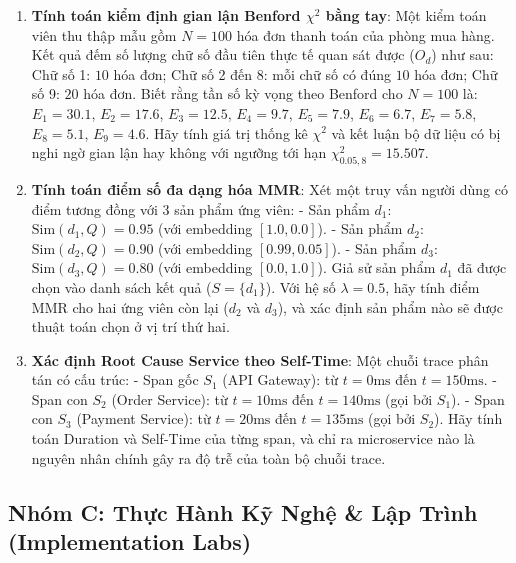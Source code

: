 \begin{enumerate}[label=\textbf{B\arabic*.}]
  \item \textbf{Tính toán kiểm định gian lận Benford $\chi^2$ bằng tay}:
  Một kiểm toán viên thu thập mẫu gồm $N = 100$ hóa đơn thanh toán của phòng mua hàng. Kết quả đếm số lượng chữ số đầu tiên thực tế quan sát được ($O_d$) như sau:
  Chữ số 1: $10$ hóa đơn; Chữ số 2 đến 8: mỗi chữ số có đúng $10$ hóa đơn; Chữ số 9: $20$ hóa đơn.
  Biết rằng tần số kỳ vọng theo Benford cho $N=100$ là: $E_1 = 30.1$, $E_2 = 17.6$, $E_3 = 12.5$, $E_4 = 9.7$, $E_5 = 7.9$, $E_6 = 6.7$, $E_7 = 5.8$, $E_8 = 5.1$, $E_9 = 4.6$.
  Hãy tính giá trị thống kê $\chi^2$ và kết luận bộ dữ liệu có bị nghi ngờ gian lận hay không với ngưỡng tới hạn $\chi^2_{0.05, 8} = 15.507$.

  \item \textbf{Tính toán điểm số đa dạng hóa MMR}:
  Xét một truy vấn người dùng có điểm tương đồng với 3 sản phẩm ứng viên:
  - Sản phẩm $d_1$: $\text{Sim}(d_1, Q) = 0.95$ (với embedding $[1.0, 0.0]$).
  - Sản phẩm $d_2$: $\text{Sim}(d_2, Q) = 0.90$ (với embedding $[0.99, 0.05]$).
  - Sản phẩm $d_3$: $\text{Sim}(d_3, Q) = 0.80$ (với embedding $[0.0, 1.0]$).
  Giả sử sản phẩm $d_1$ đã được chọn vào danh sách kết quả ($S = \{d_1\}$).
  Với hệ số $\lambda = 0.5$, hãy tính điểm MMR cho hai ứng viên còn lại ($d_2$ và $d_3$), và xác định sản phẩm nào sẽ được thuật toán chọn ở vị trí thứ hai.

  \item \textbf{Xác định Root Cause Service theo Self-Time}:
  Một chuỗi trace phân tán có cấu trúc:
  - Span gốc $S_1$ (API Gateway): từ $t = 0\text{ms}$ đến $t = 150\text{ms}$.
  - Span con $S_2$ (Order Service): từ $t = 10\text{ms}$ đến $t = 140\text{ms}$ (gọi bởi $S_1$).
  - Span con $S_3$ (Payment Service): từ $t = 20\text{ms}$ đến $t = 135\text{ms}$ (gọi bởi $S_2$).
  Hãy tính toán Duration và Self-Time của từng span, và chỉ ra microservice nào là nguyên nhân chính gây ra độ trễ của toàn bộ chuỗi trace.
\end{enumerate}

\subsection{Nhóm C: Thực Hành Kỹ Nghệ \& Lập Trình (Implementation Labs)}

